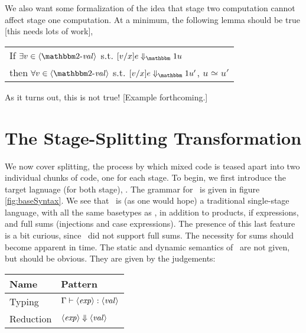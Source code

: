 \documentclass{article}
\begin{document}
We also want some formalization of the idea that stage two computation cannot affect stage one computation.  At a minimum, the following lemma should be true [this needs lots of work],

\begin{center}
\begin{tabular}{l}
If $\exists v\in \valt$ s.t. $\reduceone {[v/x]e}{u}$ \\
then $\forall v\in \valt$ s.t. $\reduceone {[v/x]e}{u'}$, $u \simeq u'$
\end{tabular}
\end{center}

As it turns out, this is not true! [Example forthcoming.]




\section{The Stage-Splitting Transformation}

We now cover splitting, the process by which mixed code is teased apart into two individual chunks of code, one for each stage.  To begin, we first introduce the target lagnuage (for both stage), \ellTarget.   The grammar for \ellTarget~is given in figure \ref{fig:baseSyntax}.  We see that \ellTarget~is (as one would hope) a traditional single-stage language, with all the same basetypes as \ellStaged, in addition to products, if expressions, and full sums (injections and case expressions).  The presence of this last feature is a bit curious, since \ellStaged~did not support full sums.  The necessity for sums should become apparent in time.  The static and dynamic semantics of \ellTarget~are not given, but should be obvious.  They are given by the judgements:

\begin{center}
\begin{tabular}{|l|l|} \hline
Name & Pattern \\ \hline
Typing & ${\Gamma} \vdash {\langle\mathit{exp}\rangle}:{\langle\mathit{val}\rangle}$ \\  \hline
Reduction & ${\langle\mathit{exp}\rangle} \Downarrow {\langle\mathit{val}\rangle}$ \\ \hline
\end{tabular}
\end{center}
\end{document}
